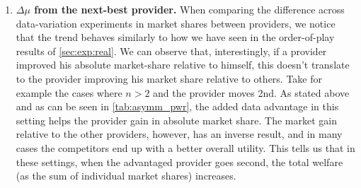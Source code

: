 \begin{enumerate}
    \item \textbf{$\Delta\mu$ from the next-best provider.} 
    When comparing the difference across data-variation experiments in market shares between providers, we notice that the trend behaves similarly to how we have seen in the order-of-play results of  \cref{sec:exp:real}. We can observe that,  interestingly, if a provider improved his absolute market-share relative to himself, this doesn't translate to the provider improving his market share relative to others. Take for example the cases where $n>2$ and the provider moves 2nd. As stated above and as can be seen in \cref{tab:asymm_pwr}, the added data advantage in this setting helps the provider gain in absolute market share.  The market gain relative to the other providers, however, has an inverse result, and in many cases the competitors end up with a better overall utility. This tells us that in these settings, when the advantaged provider goes second, the total welfare (as the sum of individual market shares) increases.
    
\end{enumerate}




